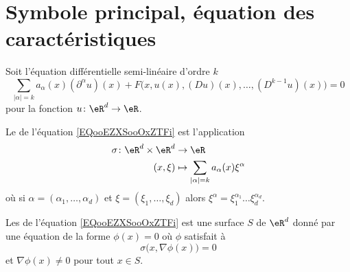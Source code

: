 
\section{Symbole principal, équation des caractéristiques}

Soit l'équation différentielle semi-linéaire d'ordre \( k\)
\begin{equation}        \label{EQooEZXSooOxZTFi}
	\sum_{| \alpha |=k}a_{\alpha}(x)(\partial^{\alpha}u)(x)+F\Big( x,u(x),(Du)(x),\ldots, (D^{k-1}u)(x) \Big)=0
\end{equation}
pour la fonction \( u\colon \eR^d\to \eR\).

\begin{definition}
	Le  de l'équation \eqref{EQooEZXSooOxZTFi} est l'application
	\begin{equation}
		\begin{aligned}
			\sigma\colon \eR^d\times \eR^d & \to \eR                                              \\
			(x,\xi)                        & \mapsto \sum_{| \alpha |=k}a_{\alpha}(x)\xi^{\alpha}
		\end{aligned}
	\end{equation}
	où si \( \alpha=(\alpha_1,\ldots, \alpha_d)\) et \( \xi=(\xi_1,\ldots, \xi_d)\) alors \( \xi^{\alpha}=\xi_1^{\alpha_1}\ldots\xi_d^{\alpha_d}\).
\end{definition}

\begin{definition}      \label{DEFooYYNOooZlZMxu}
	Les  de l'équation \eqref{EQooEZXSooOxZTFi} est une surface \( S\) de \( \eR^d\) donné par une équation de la forme \( \phi(x)=0\) où \( \phi\) satisfait à
	\begin{equation}
		\sigma\big( x,\nabla\phi(x) \big)=0
	\end{equation}
	et \( \nabla\phi(x)\neq 0\) pour tout \( x\in S\).
\end{definition}

